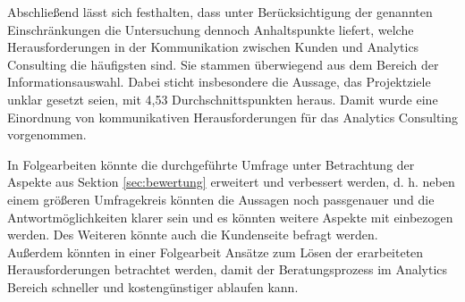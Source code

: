 \documentclass[../main.tex]{subfiles}
\begin{document}
Abschließend lässt sich festhalten, dass unter Berücksichtigung der genannten Einschränkungen die Untersuchung dennoch Anhaltspunkte liefert, welche Herausforderungen in der Kommunikation zwischen Kunden und Analytics Consulting die häufigsten sind. 
Sie stammen überwiegend aus dem Bereich der Informationsauswahl. 
Dabei sticht insbesondere die Aussage, das Projektziele unklar gesetzt seien, mit 4,53 Durchschnittspunkten heraus.
Damit wurde eine Einordnung von kommunikativen Herausforderungen für das Analytics Consulting vorgenommen.

In Folgearbeiten könnte die durchgeführte Umfrage unter Betrachtung der Aspekte aus Sektion \ref{sec:bewertung} erweitert und verbessert werden, d. h. neben einem größeren Umfragekreis könnten die Aussagen noch passgenauer und die Antwortmöglichkeiten klarer sein und es könnten weitere Aspekte mit einbezogen werden. Des Weiteren könnte auch die Kundenseite befragt werden.
\\
Außerdem könnten in einer Folgearbeit Ansätze zum Lösen der erarbeiteten Herausforderungen betrachtet werden, damit der Beratungsprozess im Analytics Bereich schneller und kostengünstiger ablaufen kann.
\end{document}
